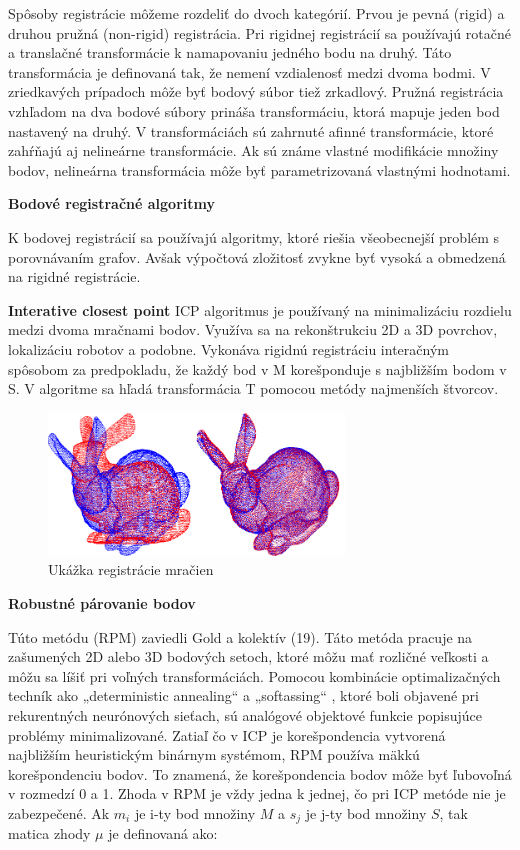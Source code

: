 Spôsoby registrácie môžeme rozdeliť do dvoch kategórií. Prvou je pevná (rigid) a druhou pružná (non-rigid) registrácia. Pri rigidnej registrácií sa používajú rotačné a translačné transformácie k namapovaniu jedného bodu na druhý. Táto transformácia je definovaná tak, že nemení vzdialenosť medzi dvoma bodmi. V zriedkavých prípadoch môže byť bodový súbor tiež zrkadlový. Pružná registrácia vzhľadom na dva bodové súbory prináša transformáciu, ktorá mapuje jeden bod nastavený na druhý. V transformáciách sú zahrnuté afinné transformácie, ktoré zahŕňajú aj nelineárne transformácie. Ak sú známe vlastné modifikácie množiny bodov, nelineárna transformácia môže byť parametrizovaná vlastnými hodnotami.\newline

\textbf{Bodové registračné algoritmy}

K bodovej registrácií sa používajú algoritmy, ktoré riešia všeobecnejší problém s porovnávaním grafov. Avšak výpočtová zložitosť zvykne byť vysoká a obmedzená na rigidné registrácie.\newline


\textbf{Interative closest point}
ICP algoritmus je používaný na minimalizáciu rozdielu medzi dvoma mračnami bodov. Využíva sa na rekonštrukciu 2D a 3D povrchov, lokalizáciu robotov a podobne. Vykonáva rigidnú registráciu interačným spôsobom za predpokladu, že každý bod v M korešponduje s najbližším bodom v S. V algoritme sa hľadá transformácia T pomocou metódy najmenších štvorcov.

\begin{figure}[h]

	\centering

	\includegraphics[width=0.7\textwidth]{figures/icp_principle.png} 

	\caption{Ukážka registrácie mračien}
	\label{fig:icp_principle}

\end{figure}
\newpage
\textbf{Robustné párovanie bodov}

Túto metódu (RPM) zaviedli Gold a kolektív (19). Táto metóda pracuje na zašumených 2D alebo 3D bodových setoch, ktoré môžu mať rozličné veľkosti a môžu sa líšiť pri voľných transformáciách. Pomocou kombinácie optimalizačných techník ako „deterministic annealing“ a „softassing“ , ktoré boli objavené pri rekurentných neurónových sieťach, sú analógové objektové funkcie popisujúce problémy minimalizované. Zatiaľ čo v ICP je korešpondencia vytvorená najbližším heuristickým binárnym systémom, RPM používa mäkkú korešpondenciu bodov. To znamená, že korešpondencia bodov môže byť ľubovoľná v rozmedzí 0 a 1. Zhoda v RPM je vždy jedna k jednej, čo pri ICP metóde nie je zabezpečené. Ak $m_i$ je i-ty bod množiny $M$ a $s_j$ je j-ty bod množiny $S$, tak matica zhody $\mu$ je definovaná ako:

